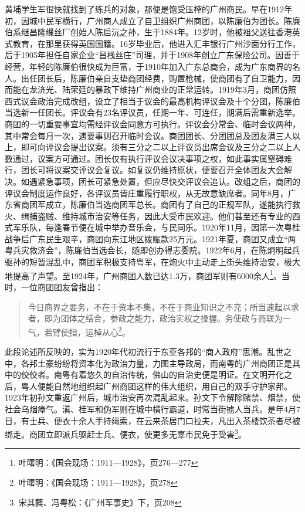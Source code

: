 黄埔学生军很快就找到了练兵的对象，那便是饱受压榨的广州商民。早在1912年初，因城中民军横行，广州商人成立了自卫组织广州商团，以陈廉伯为团长。陈廉伯系继昌隆缫丝厂创始人陈启沅之孙，生于1884年。12岁时，他被祖父送往香港英式教育，在那里获得英国国籍。16岁毕业后，他进入汇丰银行广州沙面分行工作，后于1905年担任自家企业“昌栈丝庄”司理，并于1908年创立广东保险公司。因善于经营，年轻的陈廉伯很快成为巨富，于1910年加入广东总商会，成为广东商界的名人。出任团长后，陈廉伯亲自支垫商团经费，购置枪械，使商团有了自卫能力，因而能在龙济光、陆荣廷的暴政下维持广州商业的正常运转。1919年3月，商团仿照西式议会政治完成改组，设立了相当于议会的最高机构评议会及十个分团，陈廉伯当选新一任团长。评议会有23名评议员，任期一年、可连任，期满后需重新选举。商团的一切重要事宜均需经评议会同意方可执行。评议会分常会、临时会议两种，其中常会每月一次，遇要事则召开临时会议。商团团长、分团团总及团友满三人以上，即可向评议会提出议案。须有三分之二以上评议员出席会议及三分之二以上人数通过，议案方可通过。团长仅有执行评议会议决事项之权，如此事实属窒碍难行，团长可将议案交评议会复议。如复议仍维持原状，便要召开全体团友大会解决。如遇紧急事项，团长可紧急处置，但应尽快交评议会追认。改组之后，商团的评议会制度运作良好，各评议员皆庄重履行职权，从无故意缺席者。同年8月，广东省商团军成立，陈廉伯当选商团军总长。商团有了自己的正规军队，遂能执行救火、缉捕盗贼、维持城市治安等任务，因此大受市民欢迎。他们甚至还有专业的西式军乐队，每逢春节便在城中举办音乐会，与民同乐。1920年11月，因第一次粤桂战争后广东民生艰辛，商团向东江地区拨赈款25万元。1921年夏，商团又成立“两粤兵灾救济会”，陈廉伯当选会长，随即创办得志婴院。1922年6月，在陈炯明起兵驱孙的短暂混乱中，商团军积极支持粤军，在炮火中主动走上街头维持治安，极大地提高了声望。至1924年，广州商团人数已达1.3万，商团军则有6000余人\footnote{叶曙明：《国会现场：1911—1928》，页276—277}。当时，一位商团团友曾指出：

\begin{quote}
今日商界之要务，不在于资本不集，不在于商业知识之不充；所当速起以求者，即为团体之结合，参政之能力，政治实权之操握。务使政与商联为一气，若臂使指，运棹从心\footnote{叶曙明：《国会现场：1911—1928》，页278}。
\end{quote}

此段论述所反映的，实为1920年代初流行于东亚各邦的“商人政府”思潮。乱世之中，各邦土豪纷纷将资本化为政治力量，力图主导政局，而南粤的广州商团正是其中的佼佼者。南粤有着悠久的自治传统，佛山的自治史便是明证。在文明开化之后，粤人便能自然地组织起广州商团这样的伟大组织，用自己的双手守护家邦。1923年初孙文重返广州后，城市治安再次混乱起来。孙文下令解除赌禁、烟禁，使社会乌烟瘴气。滇、桂军和伪军则在城中横行霸道，时常当街掳人当兵。是年4月7日，有士兵、便衣十余人手持绳索，在云来茶居门口拉夫，凡出入茶楼饮茶者尽被绑走。商团立即派兵驱赶士兵、便衣，使更多无辜市民免于受害\footnote{宋其蕤、冯粤松：《广州军事史》下，页208}。


